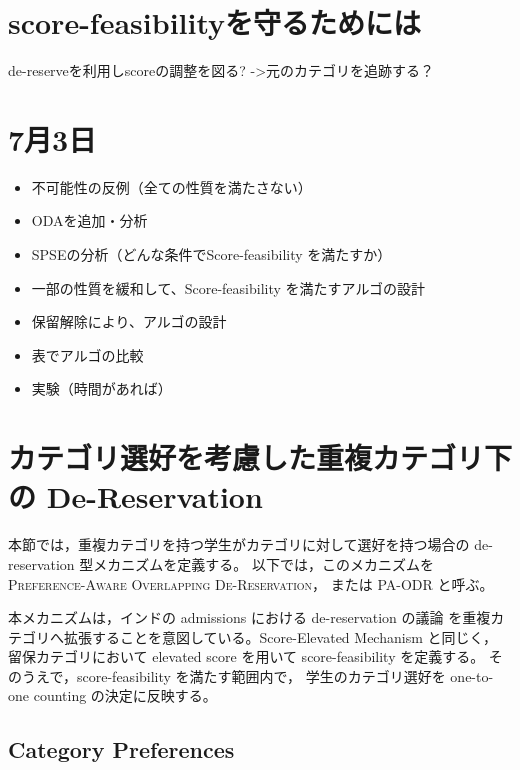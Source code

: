 \documentclass[
  12pt,
  a4paper,
  oneside,
  onecolumn,
  titlepage,
  final
]{jsarticle}
\newcommand{\1}{\mathbf{1}}
\begin{document}
\section{score-feasibilityを守るためには}
de-reserveを利用しscoreの調整を図る?
->元のカテゴリを追跡する？


\section{7月3日}

\begin{itemize}
    \item 不可能性の反例（全ての性質を満たさない）
    \item ODAを追加・分析
    \item SPSEの分析（どんな条件でScore-feasibility を満たすか）
    \item 一部の性質を緩和して、Score-feasibility を満たすアルゴの設計
    \item 保留解除により、アルゴの設計
    \item 表でアルゴの比較
    \item 実験（時間があれば）
\end{itemize}

\section{カテゴリ選好を考慮した重複カテゴリ下の De-Reservation}

本節では，重複カテゴリを持つ学生がカテゴリに対して選好を持つ場合の
de-reservation 型メカニズムを定義する。
以下では，このメカニズムを
\textsc{Preference-Aware Overlapping De-Reservation}，
または \textsc{PA-ODR} と呼ぶ。

本メカニズムは，インドの admissions における de-reservation の議論 \citep{AyTu20a,AyTu23a} を重複カテゴリへ拡張することを意図している。Score-Elevated Mechanism と同じく，
留保カテゴリにおいて elevated score を用いて score-feasibility を定義する。
そのうえで，score-feasibility を満たす範囲内で，
学生のカテゴリ選好を one-to-one counting の決定に反映する。



\subsection{Category Preferences}
\end{document}
